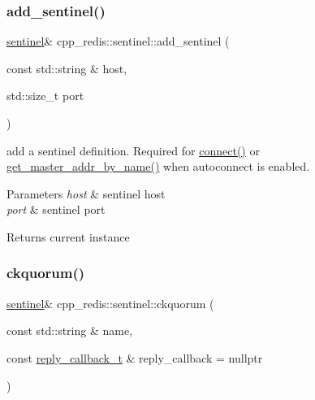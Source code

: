 \subsubsection{\texorpdfstring{add\+\_\+sentinel()}{add\_sentinel()}}
{\footnotesize\ttfamily \hyperlink{classcpp__redis_1_1sentinel}{sentinel}\& cpp\+\_\+redis\+::sentinel\+::add\+\_\+sentinel (\begin{DoxyParamCaption}\item[{const std\+::string \&}]{host,  }\item[{std\+::size\+\_\+t}]{port }\end{DoxyParamCaption})}

add a sentinel definition. Required for \hyperlink{classcpp__redis_1_1sentinel_a1dfba8240daf7cfa7502f57957cffbda}{connect()} or \hyperlink{classcpp__redis_1_1sentinel_a2886493b40b00dfafdd3b22dfe28e0c3}{get\+\_\+master\+\_\+addr\+\_\+by\+\_\+name()} when autoconnect is enabled.


\begin{DoxyParams}{Parameters}
{\em host} & sentinel host \\
\hline
{\em port} & sentinel port \\
\hline
\end{DoxyParams}
\begin{DoxyReturn}{Returns}
current instance 
\end{DoxyReturn}
\mbox{\label{classcpp__redis_1_1sentinel_aaed03955e468d9f7c3df37376ecafc3a}} 
\subsubsection{\texorpdfstring{ckquorum()}{ckquorum()}}
{\footnotesize\ttfamily \hyperlink{classcpp__redis_1_1sentinel}{sentinel}\& cpp\+\_\+redis\+::sentinel\+::ckquorum (\begin{DoxyParamCaption}\item[{const std\+::string \&}]{name,  }\item[{const \hyperlink{classcpp__redis_1_1sentinel_ae1a150ff8787208c47414397a061c9a7}{reply\+\_\+callback\+\_\+t} \&}]{reply\+\_\+callback = {\ttfamily nullptr} }\end{DoxyParamCaption})}

\mbox{\label{classcpp__redis_1_1sentinel_a4f5364cf618fefe34ced591d698f5caf}} 

